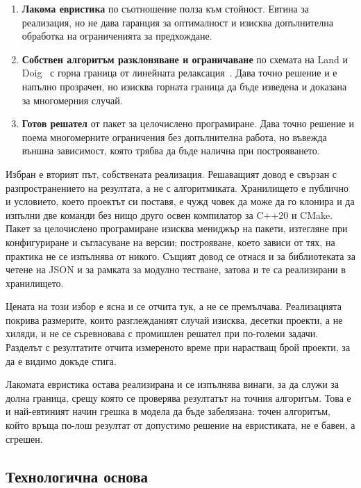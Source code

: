 \begin{enumerate}[topsep=0pt,itemsep=0pt,leftmargin=*]
\item \textbf{Лакома евристика} по съотношение полза към стойност. Евтина за
      реализация, но не дава гаранция за оптималност и изисква допълнителна
      обработка на ограниченията за предхождане.
\item \textbf{Собствен алгоритъм разклоняване и ограничаване} по схемата
      на Land и Doig~\cite{land1960branch} с горна граница от линейната
      релаксация~\cite{martello1990knapsack}. Дава точно решение и е напълно
      прозрачен, но изисква горната граница да бъде изведена и доказана за
      многомерния случай.
\item \textbf{Готов решател} от пакет за целочислено програмиране. Дава точно
      решение и поема многомерните ограничения без допълнителна работа, но
      въвежда външна зависимост, която трябва да бъде налична при построяването.
\end{enumerate}

Избран е вторият път, собствената реализация. Решаващият довод е свързан с
разпространението на резултата, а не с алгоритмиката. Хранилището е публично и
условието, което проектът си поставя, е чужд човек да може да го клонира и да
изпълни две команди без нищо друго освен компилатор за C++20 и CMake. Пакет за
целочислено програмиране изисква мениджър на пакети, изтегляне при конфигуриране
и съгласуване на версии; построяване, което зависи от тях, на практика не се
изпълнява от никого. Същият довод се отнася и за библиотеката за четене на JSON и
за рамката за модулно тестване, затова и те са реализирани в хранилището.

Цената на този избор е ясна и се отчита тук, а не се премълчава. Реализацията
покрива размерите, които разглежданият случай изисква, десетки проекти, а не
хиляди, и не се съревновава с промишлен решател при по-големи задачи. Разделът с
резултатите отчита измереното време при нарастващ брой проекти, за да е видимо
докъде стига.

Лакомата евристика остава реализирана и се изпълнява винаги, за да служи за
долна граница, срещу която се проверява резултатът на точния алгоритъм. Това е и
най-евтиният начин грешка в модела да бъде забелязана: точен алгоритъм, който
връща по-лош резултат от допустимо решение на евристиката, не е бавен, а
сгрешен.

\subsection{Технологична основа}

